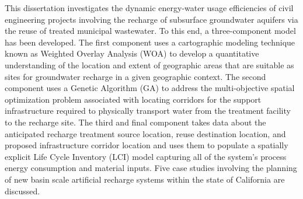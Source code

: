 
This dissertation investigates the dynamic energy-water usage efficiencies of civil engineering projects involving the recharge of subsurface groundwater aquifers via the reuse of treated municipal wastewater. To this end, a three-component model has been developed. The first component uses a cartographic modeling technique known as Weighted Overlay Analysis (WOA) to develop a quantitative understanding of the location and extent of geographic areas that are suitable as sites for groundwater recharge in a given geographic context. The second component uses a Genetic Algorithm (GA) to address the multi-objective spatial optimization problem associated with locating corridors for the support infrastructure required to physically transport water from the treatment facility to the recharge site. The third and final component takes data about the anticipated recharge treatment source location, reuse destination location, and proposed infrastructure corridor location and uses them to populate a spatially explicit Life Cycle Inventory (LCI) model capturing all of the system's process energy consumption and material inputs. Five case studies involving the planning of new basin scale artificial recharge systems within the state of California are discussed.